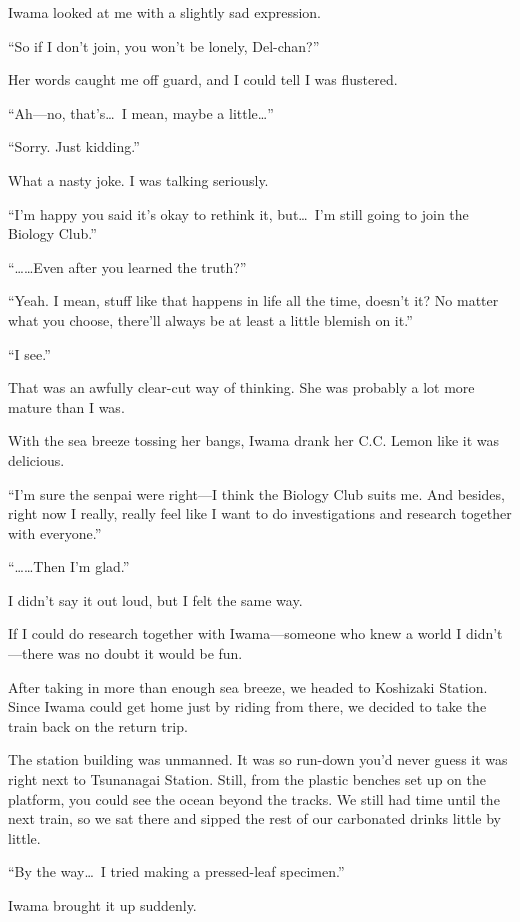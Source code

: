 \documentclass[
    a4paper,
    12pt,
    twoside,
    openany,
    UTF8,
    fontset=windows
]{ctexbook}
\begin{document}
Iwama looked at me with a slightly sad expression.

``So if I don't join, you won't be lonely, Del-chan?''

Her words caught me off guard, and I could tell I was flustered.

``Ah---no, that's\dots\ I mean, maybe a little\dots''

``Sorry. Just kidding.''

What a nasty joke. I was talking seriously.

``I'm happy you said it's okay to rethink it, but\dots\ I'm still going to join the Biology Club.''

``\dots\dots Even after you learned the truth?''

``Yeah. I mean, stuff like that happens in life all the time, doesn't it? No matter what you choose, there'll always be at least a little blemish on it.''

``I see.''

That was an awfully clear-cut way of thinking. She was probably a lot more mature than I was.

With the sea breeze tossing her bangs, Iwama drank her C.C. Lemon like it was delicious.

``I'm sure the senpai were right---I think the Biology Club suits me. And besides, right now I really, really feel like I want to do investigations and research together with everyone.''

``\dots\dots Then I'm glad.''

I didn't say it out loud, but I felt the same way.

If I could do research together with Iwama---someone who knew a world I didn't---there was no doubt it would be fun.

After taking in more than enough sea breeze, we headed to Koshizaki Station. Since Iwama could get home just by riding from there, we decided to take the train back on the return trip.

The station building was unmanned. It was so run-down you'd never guess it was right next to Tsunanagai Station. Still, from the plastic benches set up on the platform, you could see the ocean beyond the tracks. We still had time until the next train, so we sat there and sipped the rest of our carbonated drinks little by little.

``By the way\dots\ I tried making a pressed-leaf specimen.''

Iwama brought it up suddenly.
\end{document}
